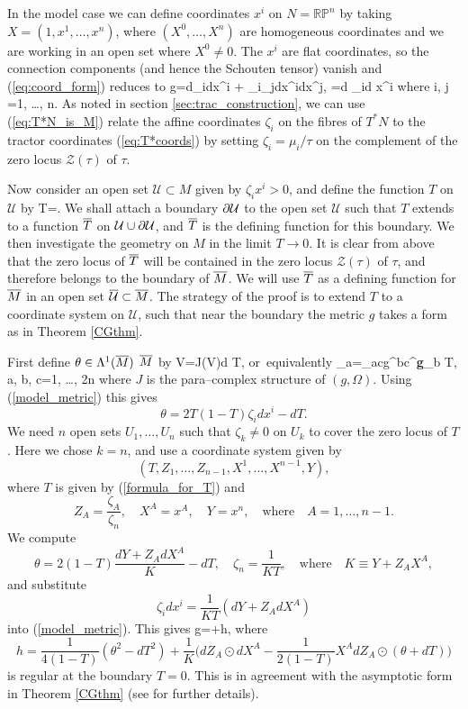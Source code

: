In the model case we can define coordinates $x^i$ on $N=\mathbb{RP}^n$ by taking $X=(1,x^1,\dots,x^n)$, where $(X^0,\dots,X^n)$ are homogeneous coordinates and we are working in an open set where $X^0\neq 0$. The ${x^i}$ are flat coordinates, so the connection components (and hence the Schouten tensor) vanish and (\ref{eq:coord_form}) reduces to
\be
\label{model_metric}
g=d\zeta_i\odot dx^i + \zeta_i\zeta_jdx^i\odot dx^j, \qquad
\Omega=d \zeta_i\wedge d x^i \quad
\mbox{where}\quad
i, j =1, \dots, n.
\ee
As noted in section \ref{sec:trac_construction}, we can use (\ref{eq:T*N_is_M}) relate the affine coordinates $\zeta_i$ on the fibres of $T^*N$ to the tractor coordinates (\ref{eq:T*coords}) by setting $\zeta_i=\mu_i/\tau$ on the complement of the zero locus ${\mathcal Z}(\tau)$ of $\tau$.

Now consider an open set  ${\mathcal U}\subset M$ given
by  $\zeta_ix^i>0$, and define the function $T$ on ${\mathcal U}$ by
\be
\label{formula_for_T}
T=.
\ee
We shall attach a boundary  $\partial \mathcal{U}$ to the open set $\mathcal{U}$ 
such that $T$ extends to a function $\overline{T}$ on $\mathcal{U}\cup \partial \mathcal{U}$, and
$\overline{T}$ is  the defining function for this boundary.
We then investigate the geometry on $M$ in the limit $T\rightarrow 0$.
It is clear from above that
the zero locus of $\overline{T}$ will be contained in the zero locus $\mathcal{Z}(\tau)$ of $\tau$, and
therefore belongs to the boundary of $\overline{M}$. We will 
use $\overline{T}$ as a defining function for $\overline{M}$ in an open set $\overline{\mathcal{U}}\subset\overline{M}$.
The strategy of the proof is to extend $T$ to a coordinate system on 
$\mathcal{U}$, such that near the boundary the metric $g$ takes a form
as in Theorem \ref{CGthm}.


First define $\theta\in \Lambda^1(\overline{M})$ $\overline{M}$
by 
\be
\label{def_theta}
V\hook \theta=J(V)\hook d T, \quad\mbox{or equivalently}\quad 
\theta_a=\Omega_{ac}g^{bc}{{\nabla}^{\bf g}}_b T, \quad a, b, c=1, \dots, 2n
\ee
where $J$ is the para--complex structure of $(g,  \Omega)$. Using (\ref{model_metric}) this  gives
\[
\theta=2T(1-T)\zeta_id x^i-dT.
\]
We need $n$  open sets $U_1, \dots, U_n$ such that $\zeta_k\neq 0$ on $U_k$
to cover the zero locus of $T$. Here we chose $k=n$, and use
a coordinate system given by
\[
(T, Z_1, \dots, Z_{n-1}, X^1, \dots,
 X^{n-1}, Y),
\] 
where $T$ is
given by (\ref{formula_for_T}) and
\[
Z_A=\frac {\zeta_A}{\zeta_n}, \quad X^A=x^A, \quad Y=x^{n}, \quad\mbox{where}\quad
A=1, \dots, n-1.
\]
We compute
\[
\theta=2(1-T)\frac{dY+Z_AdX^A}{K}-dT, \quad
\zeta_n=\frac{1}{KT}, \quad \mbox{where}\quad K\equiv Y+Z_AX^A,
\]
and substitute
\[
\zeta_i dx^i=\frac{1}{KT}(dY+Z_AdX^A)
\]
into (\ref{model_metric}). This gives
\be
\label{CG_Form}
g=+h,
\ee
where 
\[
h=\frac{1}{4(1-T)}(\theta^2-dT^2)+\frac{1}{K}\Big(dZ_A\odot dX^A-\frac{1}{2(1-T)}X^A dZ_A\odot(\theta+dT)\Big)
\]
is regular at the boundary $T=0$. This is in agreement with the 
asymptotic form in Theorem \ref{CGthm} (see \cite{CG} for further details).

